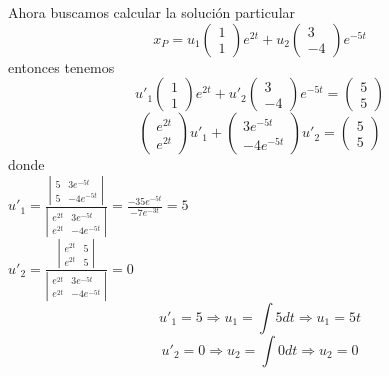 Ahora buscamos calcular la solución particular
$$x_P = u_1 \begin{pmatrix}
     1\\
     1
     \end{pmatrix}e^{2t} + u_2 \begin{pmatrix}
     3\\
     -4
     \end{pmatrix}e^{-5t}$$ entonces tenemos
$$u'_1 \begin{pmatrix}
     1\\
     1
     \end{pmatrix}e^{2t} + u'_2 \begin{pmatrix}
     3\\
     -4
     \end{pmatrix}e^{-5t} = \begin{pmatrix}
     5\\
     5
     \end{pmatrix}$$
$$\begin{pmatrix}
     e^{2t}\\
     e^{2t}
     \end{pmatrix}u'_1 + \begin{pmatrix}
     3e^{-5t}\\
     -4e^{-5t}
     \end{pmatrix}u'_2 = \begin{pmatrix}
     5\\
     5
     \end{pmatrix}$$ 
donde\\
$u'_1 = \frac{\left|\begin{matrix}
5 & 3e^{-5t}\\
5 & -4e^{-5t}
\end{matrix} \right|}{\left|\begin{matrix}
e^{2t} & 3e^{-5t}\\
e^{2t} & -4e^{-5t}
\end{matrix} \right|} = \frac{-35e^{-5t}}{-7e^{-3t}} = 5$\\
$u'_2 = \frac{\left|\begin{matrix}
e^{2t} & 5\\
e^{2t} & 5
\end{matrix} \right|}{\left|\begin{matrix}
e^{2t} & 3e^{-5t}\\
e^{2t} & -4e^{-5t}
\end{matrix} \right|} = 0$
$$u'_1 = 5 \Rightarrow u_1 = \int 5dt \Rightarrow u_1 = 5t$$
$$u'_2 = 0 \Rightarrow u_2 = \int 0dt \Rightarrow u_2 = 0$$
